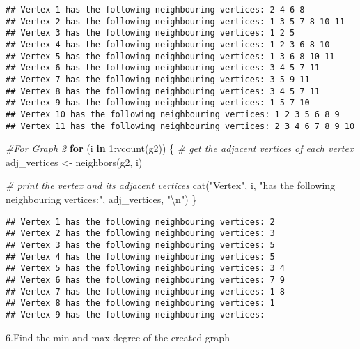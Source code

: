 \documentclass[
]{article}
\newenvironment{Shaded}{\begin{snugshade}}{\end{snugshade}}
\newcommand{\CommentTok}[1]{\textcolor[rgb]{0.56,0.35,0.01}{\textit{#1}}}
\newcommand{\ControlFlowTok}[1]{\textcolor[rgb]{0.13,0.29,0.53}{\textbf{#1}}}
\newcommand{\DecValTok}[1]{\textcolor[rgb]{0.00,0.00,0.81}{#1}}
\newcommand{\FunctionTok}[1]{\textcolor[rgb]{0.00,0.00,0.00}{#1}}
\newcommand{\NormalTok}[1]{#1}
\newcommand{\OtherTok}[1]{\textcolor[rgb]{0.56,0.35,0.01}{#1}}
\newcommand{\SpecialCharTok}[1]{\textcolor[rgb]{0.00,0.00,0.00}{#1}}
\newcommand{\StringTok}[1]{\textcolor[rgb]{0.31,0.60,0.02}{#1}}
\begin{document}
\begin{verbatim}
## Vertex 1 has the following neighbouring vertices: 2 4 6 8 
## Vertex 2 has the following neighbouring vertices: 1 3 5 7 8 10 11 
## Vertex 3 has the following neighbouring vertices: 1 2 5 
## Vertex 4 has the following neighbouring vertices: 1 2 3 6 8 10 
## Vertex 5 has the following neighbouring vertices: 1 3 6 8 10 11 
## Vertex 6 has the following neighbouring vertices: 3 4 5 7 11 
## Vertex 7 has the following neighbouring vertices: 3 5 9 11 
## Vertex 8 has the following neighbouring vertices: 3 4 5 7 11 
## Vertex 9 has the following neighbouring vertices: 1 5 7 10 
## Vertex 10 has the following neighbouring vertices: 1 2 3 5 6 8 9 
## Vertex 11 has the following neighbouring vertices: 2 3 4 6 7 8 9 10
\end{verbatim}

\begin{Shaded}
\begin{Highlighting}[]
\CommentTok{\#For Graph 2}
\ControlFlowTok{for}\NormalTok{ (i }\ControlFlowTok{in} \DecValTok{1}\SpecialCharTok{:}\FunctionTok{vcount}\NormalTok{(g2)) \{}
  \CommentTok{\# get the adjacent vertices of each vertex}
\NormalTok{  adj\_vertices }\OtherTok{\textless{}{-}} \FunctionTok{neighbors}\NormalTok{(g2, i)}
  
  \CommentTok{\# print the vertex and its adjacent vertices}
  \FunctionTok{cat}\NormalTok{(}\StringTok{"Vertex"}\NormalTok{, i, }\StringTok{"has the following neighbouring vertices:"}\NormalTok{, adj\_vertices, }\StringTok{"}\SpecialCharTok{\textbackslash{}n}\StringTok{"}\NormalTok{)}
\NormalTok{\}}
\end{Highlighting}
\end{Shaded}

\begin{verbatim}
## Vertex 1 has the following neighbouring vertices: 2 
## Vertex 2 has the following neighbouring vertices: 3 
## Vertex 3 has the following neighbouring vertices: 5 
## Vertex 4 has the following neighbouring vertices: 5 
## Vertex 5 has the following neighbouring vertices: 3 4 
## Vertex 6 has the following neighbouring vertices: 7 9 
## Vertex 7 has the following neighbouring vertices: 1 8 
## Vertex 8 has the following neighbouring vertices: 1 
## Vertex 9 has the following neighbouring vertices:
\end{verbatim}

6.Find the min and max degree of the created graph
\end{document}
